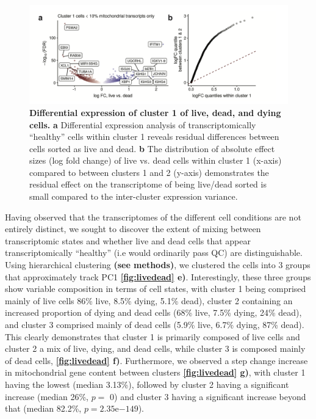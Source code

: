 \begin{figure}
	\centering
	\includegraphics[width=\textwidth]{Figures/chap3/livedead2.png}
	\caption[Differential expression of cluster 1 of live, dead, and dying cells.]
	{\small
	 \textbf{Differential expression of cluster 1 of live, dead, and dying cells.}
    \textbf{a} Differential expression analysis of transcriptomically ``healthy'' cells within cluster 1 reveals residual differences between cells sorted as live and dead.
    \textbf{b} The distribution of absolute effect sizes (log fold change) of live vs. dead cells within cluster 1 (x-axis) compared to between clusters 1 and 2 (y-axis) demonstrates the residual effect on the transcriptome of being live/dead sorted is small compared to the inter-cluster expression variance.}
	\label{fig:livedead2}

\end{figure}

Having observed that the transcriptomes of the different cell conditions are not entirely distinct, we sought to discover the extent of mixing between transcriptomic states and whether live and dead cells that appear transcriptomically ``healthy'' (i.e would ordinarily pass QC) are distinguishable. Using hierarchical clustering \textbf{(see methods)}, we clustered the cells into 3 groups  that approximately track PC1  \textbf{\autoref{fig:livedead} e)}. Interestingly, these three groups show variable composition in terms of cell states, with cluster 1 being comprised mainly of live cells 86\% live, 8.5\% dying, 5.1\% dead), cluster 2 containing an increased proportion of dying and dead cells (68\% live, 7.5\% dying, 24\% dead), and cluster 3 comprised mainly of dead cells (5.9\% live, 6.7\% dying, 87\% dead). This clearly demonstrates that cluster 1 is primarily composed of live cells and cluster 2 a mix of live, dying, and dead cells, while cluster 3 is composed mainly of dead cells, \textbf{\autoref{fig:livedead} f)}. Furthermore, we observed a step change increase in mitochondrial gene content between clusters \textbf{\autoref{fig:livedead} g)}, with cluster 1 having the lowest (median 3.13\%), followed by cluster 2 having a significant increase (median  26\%, $p=$ 0) and cluster 3 having a significant increase beyond that (median 82.2\%, $p=2.35\mathrm{e}{-149}$). 


